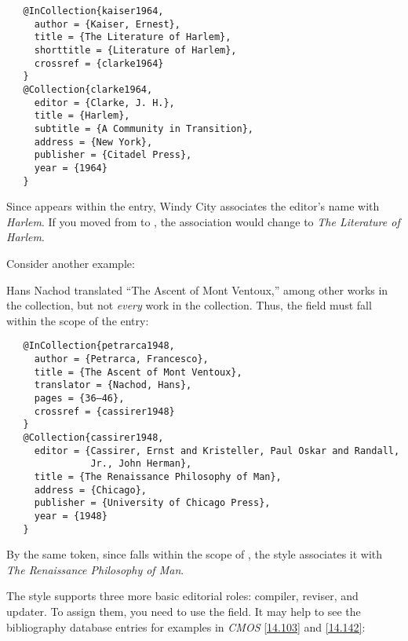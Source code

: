\documentclass[11pt,letterpaper,oneside]{article}
\begin{document}
\begin{verbatim}
   @InCollection{kaiser1964,
     author = {Kaiser, Ernest},
     title = {The Literature of Harlem},
     shorttitle = {Literature of Harlem},
     crossref = {clarke1964}
   }
   @Collection{clarke1964,
     editor = {Clarke, J. H.},
     title = {Harlem},
     subtitle = {A Community in Transition},
     address = {New York},
     publisher = {Citadel Press},
     year = {1964}
   }
\end{verbatim}

\begin{citebib}
\item \cite{kaiser1964}
\end{citebib}

\noindent Since  appears within the
 entry, Windy City associates the editor's name
with \textit{Harlem}. If you moved  from
 to , the association would
change to \textit{The Literature of Harlem}.

Consider another example:

\begin{citebib}
\item \cite{petrarca1948}
\end{citebib}

\noindent Hans Nachod translated ``The Ascent of Mont Ventoux,'' among
other works in the collection, but not \textit{every} work in the
collection. Thus, the  field must fall within the
scope of the  entry:

\begin{verbatim}
   @InCollection{petrarca1948,
     author = {Petrarca, Francesco},
     title = {The Ascent of Mont Ventoux},
     translator = {Nachod, Hans},
     pages = {36–46},
     crossref = {cassirer1948}
   }
   @Collection{cassirer1948,
     editor = {Cassirer, Ernst and Kristeller, Paul Oskar and Randall,
               Jr., John Herman},
     title = {The Renaissance Philosophy of Man},
     address = {Chicago},
     publisher = {University of Chicago Press},
     year = {1948}
   }
\end{verbatim}

\noindent By the same token, since  falls within the
scope of , the style associates it with
\textit{The Renaissance Philosophy of Man}.

The style supports three more basic editorial roles: compiler,
reviser, and updater. To assign them, you need to use the
 field. It may help to see the bibliography
database entries for examples in \textit{CMOS} \ref{14.103} and
\ref{14.142}:
\end{document}
